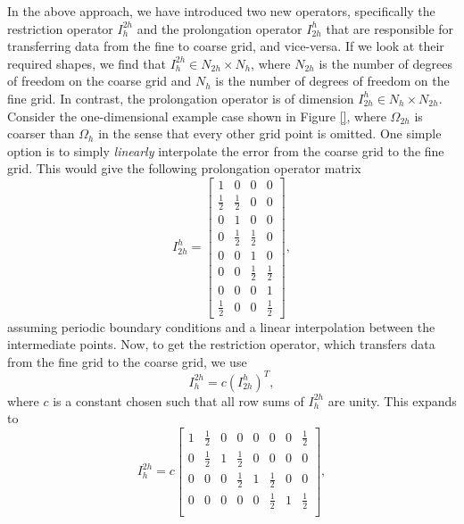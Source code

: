 In the above approach, we have introduced two new operators, specifically the restriction operator $I_{h}^{2h}$ and the prolongation operator $I_{2h}^{h}$ that are responsible for transferring data from the fine to coarse grid, and vice-versa. If we look at their required shapes, we find that $I_{h}^{2h} \in N_{2h} \times N_h$, where $N_{2h}$ is the number of degrees of freedom on the coarse grid and $N_h$ is the number of degrees of freedom on the fine grid. In contrast, the prolongation operator is of dimension $I_{2h}^{h} \in N_{h} \times N_{2h}$. Consider the one-dimensional example case shown in Figure \ref{}, where $\Omega_{2h}$ is coarser than $\Omega_h$ in the sense that every other grid point is omitted. One simple option is to simply {\it linearly} interpolate the error from the coarse grid to the fine grid. This would give the following prolongation operator matrix
\begin{equation}
	I_{2h}^{h} = 
	\begin{bmatrix}
	    1 & 0 & 0 & 0 \\
			\frac{1}{2} & \frac{1}{2} & 0 & 0 \\
			0 & 1 & 0 & 0 \\
			0 & \frac{1}{2} & \frac{1}{2} & 0 \\
	    0 & 0 & 1 & 0 \\
			0 & 0 & \frac{1}{2} & \frac{1}{2} \\
			0 & 0 & 0 & 1 \\
			\frac{1}{2} & 0 & 0 & \frac{1}{2}
	\end{bmatrix},
\end{equation}
assuming periodic boundary conditions and a linear interpolation between the intermediate points. Now, to get the restriction operator, which transfers data from the fine grid to the coarse grid, we use
\begin{equation}
	I_{h}^{2h} = c (I_{2h}^{h})^T,
\end{equation}
where $c$ is a constant chosen such that all row sums of $I_{h}^{2h}$ are unity. This expands to
\begin{equation}
	I_{h}^{2h} = c
	\begin{bmatrix}
	    1 & \frac{1}{2} & 0 & 0 & 0 & 0 & 0 & \frac{1}{2} \\
			0 & \frac{1}{2} & 1 & \frac{1}{2} & 0 & 0 & 0 & 0 \\
			0 & 0 & 0 & \frac{1}{2} & 1 & \frac{1}{2} & 0 & 0 \\
			0 & 0 & 0 & 0 & 0 & \frac{1}{2} & 1 & \frac{1}{2} \\
	\end{bmatrix},
\end{equation}
